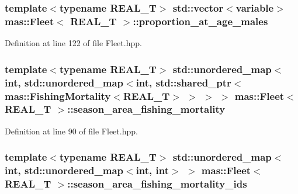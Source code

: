 \hypertarget{structmas_1_1_fleet_a8a3bf314e6f6249f84fdaded007a0067}{
\subsubsection[{proportion\-\_\-at\-\_\-age\-\_\-males}]{\setlength{\rightskip}{0pt plus 5cm}template$<$typename R\-E\-A\-L\-\_\-\-T$>$ std\-::vector$<${\bf variable}$>$ {\bf mas\-::\-Fleet}$<$ R\-E\-A\-L\-\_\-\-T $>$\-::proportion\-\_\-at\-\_\-age\-\_\-males}}\label{structmas_1_1_fleet_a8a3bf314e6f6249f84fdaded007a0067}


Definition at line 122 of file Fleet.\-hpp.

\hypertarget{structmas_1_1_fleet_a2eba2d477fe351f44a1c22f51f75018f}{
\subsubsection[{season\-\_\-area\-\_\-fishing\-\_\-mortality}]{\setlength{\rightskip}{0pt plus 5cm}template$<$typename R\-E\-A\-L\-\_\-\-T$>$ std\-::unordered\-\_\-map$<$int, std\-::unordered\-\_\-map$<$int, std\-::shared\-\_\-ptr$<${\bf mas\-::\-Fishing\-Mortality}$<$R\-E\-A\-L\-\_\-\-T$>$ $>$ $>$ $>$ {\bf mas\-::\-Fleet}$<$ R\-E\-A\-L\-\_\-\-T $>$\-::season\-\_\-area\-\_\-fishing\-\_\-mortality}}\label{structmas_1_1_fleet_a2eba2d477fe351f44a1c22f51f75018f}


Definition at line 90 of file Fleet.\-hpp.

\hypertarget{structmas_1_1_fleet_acab7b946bf0d12476d4167f9d35693e8}{
\subsubsection[{season\-\_\-area\-\_\-fishing\-\_\-mortality\-\_\-ids}]{\setlength{\rightskip}{0pt plus 5cm}template$<$typename R\-E\-A\-L\-\_\-\-T$>$ std\-::unordered\-\_\-map$<$int, std\-::unordered\-\_\-map$<$int, int$>$ $>$ {\bf mas\-::\-Fleet}$<$ R\-E\-A\-L\-\_\-\-T $>$\-::season\-\_\-area\-\_\-fishing\-\_\-mortality\-\_\-ids}}\label{structmas_1_1_fleet_acab7b946bf0d12476d4167f9d35693e8}


